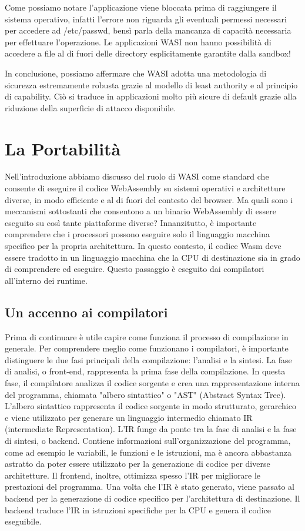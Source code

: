 Come possiamo notare l'applicazione viene bloccata prima di raggiungere il sistema operativo, infatti l'errore non
riguarda gli eventuali permessi necessari per accedere ad /etc/passwd, bensì parla della mancanza di capacità necessaria
per effettuare l'operazione. Le applicazioni WASI non hanno possibilità di accedere a file al di fuori delle directory
esplicitamente garantite dalla sandbox!

In conclusione, possiamo affermare che WASI adotta una metodologia di sicurezza estremamente robusta grazie al modello
di least authority e al principio di capability. Ciò si traduce in applicazioni molto più sicure di default grazie alla
riduzione della superficie di attacco disponibile.

\section{La Portabilità}
Nell'introduzione abbiamo discusso del ruolo di WASI come standard che consente di eseguire il codice WebAssembly su
sistemi operativi e architetture diverse, in modo efficiente e al di fuori del contesto del browser. Ma quali sono i
meccanismi sottostanti che consentono a un binario WebAssembly di essere eseguito su così tante piattaforme diverse?
Innanzitutto, è importante comprendere che i processori possono eseguire solo il linguaggio macchina specifico per la
propria architettura. In questo contesto, il codice Wasm deve essere tradotto in un linguaggio macchina che la CPU di
destinazione sia in grado di comprendere ed eseguire. Questo passaggio è eseguito dai compilatori all'interno dei
runtime.

\subsection{Un accenno ai compilatori}
Prima di continuare è utile capire come funziona il processo di compilazione in generale. Per comprendere meglio come
funzionano i compilatori, è importante distinguere le due fasi principali della compilazione: l'analisi e la sintesi. La
fase di analisi, o front-end, rappresenta la prima fase della compilazione. In questa fase, il compilatore analizza il
codice sorgente e crea una rappresentazione interna del programma, chiamata "albero sintattico" o "AST" (Abstract Syntax
Tree). L'albero sintattico rappresenta il codice sorgente in modo strutturato, gerarchico e viene utilizzato per
generare un linguaggio intermedio chiamato IR (intermediate Representation). L'IR funge da ponte tra la fase di analisi
e la fase di sintesi, o backend. Contiene informazioni sull'organizzazione del programma, come ad esempio le variabili,
le funzioni e le istruzioni, ma è ancora abbastanza astratto da poter essere utilizzato per la generazione di codice per
diverse architetture. Il frontend, inoltre, ottimizza spesso l'IR per migliorare le prestazioni del programma. Una volta
che l'IR è stato generato, viene passato al backend per la generazione di codice specifico per l'architettura di
destinazione. Il backend traduce l'IR in istruzioni specifiche per la CPU e genera il codice eseguibile.

